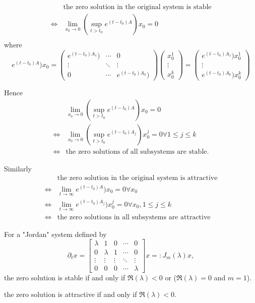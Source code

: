 \documentclass{tufte-handout}
\begin{document}
\begin{formalproof} 
\begin{align*}
	& \text{the zero solution in the original system is stable} \\
	\iff & \lim_{x_0 \to 0} (\sup_{t>t_0} e^{(t-t_0)A}) x_0 =0 \\
\end{align*}
where \[ e^{(t-t_0)A}) x_0 =
\begin{pmatrix}
	e^{(t-t_0)A_1})& \cdots & 0 \\
	\vdots & \ddots & \vdots \\
	0 & \cdots & e^{(t-t_0)A_k}) 
\end{pmatrix}
\begin{pmatrix}
	x_0^1 \\
	\vdots \\
	x_0^k
\end{pmatrix}
= 
\begin{pmatrix}
	e^{(t-t_0)A_1}) x_0^1 \\ 
	\vdots \\
	e^{(t-t_0)A_k}) x_0^k
\end{pmatrix}
 \]
 
 Hence 
 \begin{align*}
 & 	 \lim_{x_0 \to 0} (\sup_{t>t_0} e^{(t-t_0)A}) x_0 =0 \\
 	 \iff & \lim_{x_0 \to 0} (\sup_{t>t_0} e^{(t-t_0)A_j}) x_0^j =0  \forall 1 \leq j \leq k \\
 	 \iff & \text{the zero solutions of all subsystems are stable.}
 \end{align*}
 
 Similarly
 \begin{align*}
 	&\text{the zero solution in the original system is attractive} \\
	\iff & \lim_{t\to \infty} e^{(t-t_0)A}) x_0 =0  \forall x_0 \\
		\iff & \lim_{t\to \infty} e^{(t-t_0)A_j}) x_0^j =0  \forall x_0,1 \leq j \leq k \\
	\iff & 	\text{the zero solutions in all subsystems are attractive}
 \end{align*}
 \end{formalproof}
\begin{lemma} 
For a "Jordan" system defined by \[ \partial_t x = 
\begin{bmatrix}
	\lambda & 1 & 0 & \cdots & 0 \\
	0 & \lambda & 1 & \cdots & 0 \\
	\vdots & \vdots & \vdots & \ddots & \vdots \\
	0 & 0 & 0 & \cdots & \lambda
\end{bmatrix}
x =: J_m(\lambda)x, 
\]
the zero solution is stable if and only if $\Re(\lambda)<0$ or ($\Re(\lambda)=0$ and $m=1$).

the zero solution is attractive if and only if $\Re(\lambda)<0$.
\end{lemma}
\end{document}
